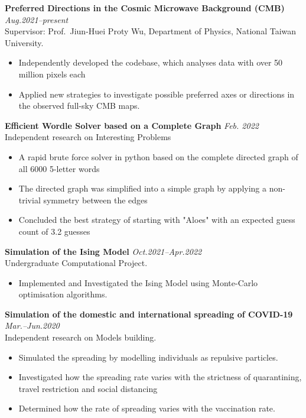 \documentclass[11pt,a4paper,roman]{moderncv}        %
\begin{document}
\textbf{Preferred Directions in the Cosmic Microwave Background (CMB)} \hfill \textit{Aug.2021--present}
\vspace*{1mm}\\
{Supervisor: Prof.\ Jiun-Huei Proty Wu, Department of Physics, National Taiwan University.}
\vspace*{1mm}
\begin{itemize}
	\item Independently developed the codebase, which analyses data with over 50 million pixels each
	\item Applied new strategies to investigate possible preferred axes or directions in the observed full-sky CMB maps.\\
\end{itemize}

\textbf{Efficient Wordle Solver based on a Complete Graph} \hfill \textit{Feb. 2022} 
\vspace*{1mm}\\
{Independent research on Interesting Problems}
\vspace*{1mm}
\begin{itemize}
	\item A rapid brute force solver in python based on the complete directed graph of all 6000 5-letter words 
	\item The directed graph was simplified into a simple graph by applying a non-trivial symmetry between the edges
	\item Concluded the best strategy of starting with "Aloes" with an expected guess count of 3.2 guesses\\
\end{itemize}

\textbf{Simulation of the Ising Model} \hfill \textit{Oct.2021--Apr.2022} 
\vspace*{1mm}\\ 
{Undergraduate Computational Project.}
\vspace*{1mm}
\begin{itemize}
	\item Implemented and Investigated the Ising Model using Monte-Carlo optimisation algorithms.\\
\end{itemize}

\textbf{Simulation of the domestic and international spreading of COVID-19} \hfill \textit{Mar.--Jun.2020} 
\vspace*{1mm}\\
{Independent research on Models building.}
\vspace*{1mm}
\begin{itemize}
	\item Simulated the spreading by modelling individuals as repulsive particles.
    \item Investigated how the spreading rate varies with the strictness of quarantining, travel restriction and  social distancing
    \item Determined how the rate of spreading varies with the vaccination rate.\\
\end{itemize}
\end{document}
